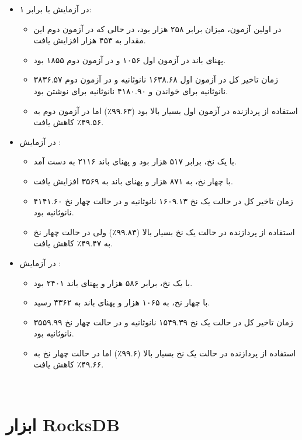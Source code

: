\begin{itemize}
    \item در آزمایش  با  برابر ۱:
    \begin{itemize}
        \item در اولین آزمون، میزان  برابر ۲۵۸ هزار بود، در حالی که در آزمون دوم این مقدار به ۴۵۳ هزار افزایش یافت.
        \item پهنای باند در آزمون اول ۱۰۵۶  و در آزمون دوم ۱۸۵۵  بود.
        \item زمان تاخیر کل در آزمون اول ۱۶۳۸.۶۸ نانوثانیه و در آزمون دوم ۳۸۳۶.۵۷ نانوثانیه برای خواندن و ۴۱۸۰.۹۰ نانوثانیه برای نوشتن بود.
        \item استفاده از پردازنده در آزمون اول بسیار بالا بود (۹۹.۶۳٪) اما در آزمون دوم به ۴۹.۵۶٪ کاهش یافت.
    \end{itemize}
    
    \item در آزمایش :
    \begin{itemize}
        \item با یک نخ،  برابر ۵۱۷ هزار بود و پهنای باند ۲۱۱۶  به دست آمد.
        \item با چهار نخ،  به ۸۷۱ هزار و پهنای باند به ۳۵۶۹  افزایش یافت.
        \item زمان تاخیر کل در حالت یک نخ ۱۶۰۹.۱۳ نانوثانیه و در حالت چهار نخ ۴۱۴۱.۶۰ نانوثانیه بود.
        \item استفاده از پردازنده در حالت یک نخ بسیار بالا (۹۹.۸۳٪) ولی در حالت چهار نخ به ۴۹.۴۷٪ کاهش یافت.
    \end{itemize}
    
    \item در آزمایش :
    \begin{itemize}
        \item با یک نخ،  برابر ۵۸۶ هزار و پهنای باند ۲۴۰۱  بود.
        \item با چهار نخ،  به ۱۰۶۵ هزار و پهنای باند به ۴۳۶۲  رسید.
        \item زمان تاخیر کل در حالت یک نخ ۱۵۴۹.۳۹ نانوثانیه و در حالت چهار نخ ۳۵۵۹.۹۹ نانوثانیه بود.
        \item استفاده از پردازنده در حالت یک نخ بسیار بالا (۹۹.۶٪) اما در حالت چهار نخ به ۴۹.۶۶٪ کاهش یافت.
    \end{itemize}
\end{itemize}
‫‫\section{ابزار RocksDB}
